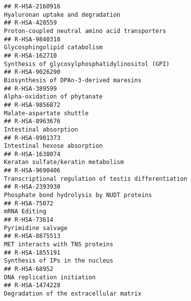 \documentclass[
]{article}
\begin{document}
\begin{verbatim}
## R-HSA-2160916                                                                                                    Hyaluronan uptake and degradation
## R-HSA-428559                                                                                        Proton-coupled neutral amino acid transporters
## R-HSA-9840310                                                                                                         Glycosphingolipid catabolism
## R-HSA-162710                                                                                       Synthesis of glycosylphosphatidylinositol (GPI)
## R-HSA-9026290                                                                                              Biosynthesis of DPAn-3-derived maresins
## R-HSA-389599                                                                                                          Alpha-oxidation of phytanate
## R-HSA-9856872                                                                                                             Malate-aspartate shuttle
## R-HSA-8963676                                                                                                                Intestinal absorption
## R-HSA-8981373                                                                                                         Intestinal hexose absorption
## R-HSA-1638074                                                                                                   Keratan sulfate/keratin metabolism
## R-HSA-9690406                                                                                 Transcriptional regulation of testis differentiation
## R-HSA-2393930                                                                                           Phosphate bond hydrolysis by NUDT proteins
## R-HSA-75072                                                                                                                           mRNA Editing
## R-HSA-73614                                                                                                                     Pyrimidine salvage
## R-HSA-8875513                                                                                                      MET interacts with TNS proteins
## R-HSA-1855191                                                                                                      Synthesis of IPs in the nucleus
## R-HSA-68952                                                                                                             DNA replication initiation
## R-HSA-1474228                                                                                              Degradation of the extracellular matrix

\end{verbatim}
\end{document}
